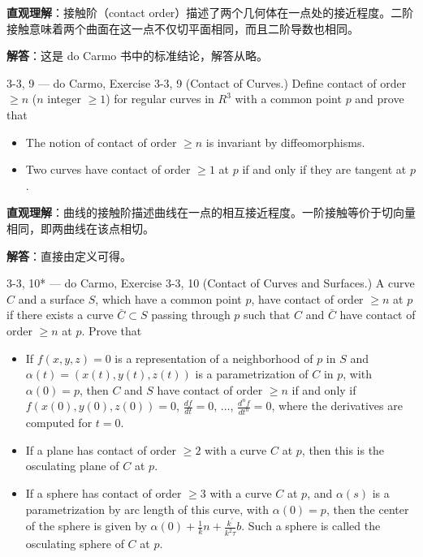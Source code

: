 \begin{solution}
\textbf{直观理解}：接触阶（contact order）描述了两个几何体在一点处的接近程度。二阶接触意味着两个曲面在这一点不仅切平面相同，而且二阶导数也相同。

\textbf{解答}：这是 do Carmo 书中的标准结论，解答从略。
\end{solution}

\begin{exercise}{3-3, 9 — do Carmo, Exercise 3-3, 9}
(Contact of Curves.) Define contact of order $\geq n$ ($n$ integer $\geq 1$) for regular curves in $R^3$ with a common point $p$ and prove that
\begin{itemize}
\item[a.] The notion of contact of order $\geq n$ is invariant by diffeomorphisms.
\item[b.] Two curves have contact of order $\geq 1$ at $p$ if and only if they are tangent at $p$.
\end{itemize}
\end{exercise}

\begin{solution}
\textbf{直观理解}：曲线的接触阶描述曲线在一点的相互接近程度。一阶接触等价于切向量相同，即两曲线在该点相切。

\textbf{解答}：直接由定义可得。
\end{solution}

\begin{exercise}{3-3, 10* — do Carmo, Exercise 3-3, 10}
(Contact of Curves and Surfaces.) A curve $C$ and a surface $S$, which have a common point $p$, have contact of order $\geq n$ at $p$ if there exists a curve $\bar{C} \subset S$ passing through $p$ such that $C$ and $\bar{C}$ have contact of order $\geq n$ at $p$. Prove that
\begin{itemize}
\item[a.] If $f(x,y,z) = 0$ is a representation of a neighborhood of $p$ in $S$ and $\alpha(t) = (x(t),y(t),z(t))$ is a parametrization of $C$ in $p$, with $\alpha(0) = p$, then $C$ and $S$ have contact of order $\geq n$ if and only if $f (x (0), y (0), z (0)) = 0$, $\frac {d f}{d t} = 0$, $\ldots$, $\frac {d ^ {n} f}{d t ^ {n}} = 0$, where the derivatives are computed for $t = 0$.
\item[b.] If a plane has contact of order $\geq 2$ with a curve $C$ at $p$, then this is the osculating plane of $C$ at $p$.
\item[c.] If a sphere has contact of order $\geq 3$ with a curve $C$ at $p$, and $\alpha(s)$ is a parametrization by arc length of this curve, with $\alpha(0) = p$, then the center of the sphere is given by $\alpha (0) + \frac {1}{k} n + \frac {k ^ {\prime}}{k ^ {2} \tau} b$. Such a sphere is called the osculating sphere of $C$ at $p$.
\end{itemize}
\end{exercise}

